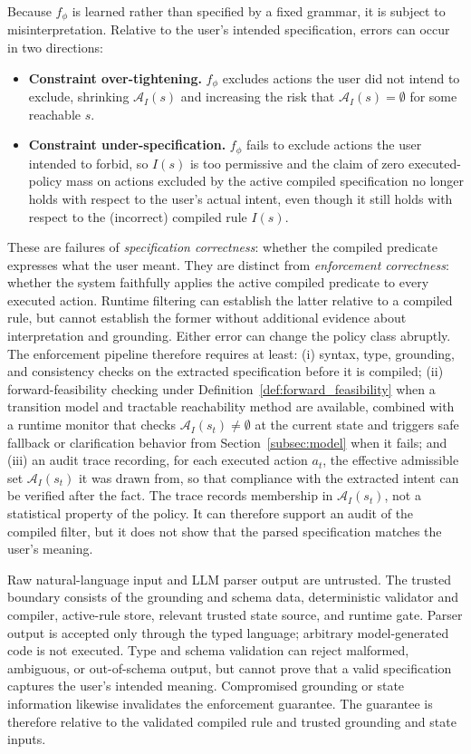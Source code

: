 \documentclass[journal]{IEEEtran}
\theoremstyle{definition}
\newcommand{\cA}{\mathcal{A}}
\begin{document}
Because $f_\phi$ is learned rather than specified by a fixed grammar, it is
subject to misinterpretation. Relative to the user's intended specification,
errors can occur in two directions:
\begin{itemize}[leftmargin=*]
  \item \textbf{Constraint over-tightening.} $f_\phi$ excludes actions the
  user did not intend to exclude, shrinking $\cA_I(s)$ and increasing the
  risk that $\cA_I(s) = \emptyset$ for some reachable $s$.
  \item \textbf{Constraint under-specification.} $f_\phi$ fails to exclude
  actions the user intended to forbid, so $I(s)$ is too permissive and the
  claim of zero executed-policy mass on actions excluded by the active compiled
  specification no longer holds with
  respect to the user's actual intent, even though it still holds with respect
  to the (incorrect) compiled rule $I(s)$.
\end{itemize}
These are failures of \emph{specification correctness}: whether the
compiled predicate expresses what the user meant. They are distinct from
\emph{enforcement correctness}: whether the system faithfully applies the
active compiled predicate to every executed action. Runtime filtering can
establish the latter relative to a compiled rule, but cannot establish the
former without additional evidence about interpretation and grounding.
Either error can change the policy class abruptly. The enforcement pipeline
therefore requires at least: (i) syntax, type,
grounding, and consistency checks on the extracted specification before it is
compiled; (ii) forward-feasibility checking under
Definition~\ref{def:forward_feasibility} when a transition model and tractable
reachability method are available,
combined with a runtime monitor that checks
$\cA_I(s_t) \neq \emptyset$ at the current state and triggers safe fallback
or clarification behavior from Section~\ref{subsec:model} when it fails; and
(iii) an audit trace recording,
for each executed action $a_t$, the effective admissible set $\cA_I(s_t)$ it was
drawn from, so that compliance with the extracted intent can be verified
after the fact. The trace records membership in $\cA_I(s_t)$, not a
statistical property of the policy. It can therefore support an audit of the
compiled filter, but it does not show that the parsed specification matches
the user's meaning.

Raw natural-language input and LLM parser output are untrusted. The trusted
boundary consists of the grounding and schema data, deterministic validator
and compiler, active-rule store, relevant trusted state source, and runtime
gate. Parser output is accepted only through the typed language; arbitrary
model-generated code is not executed. Type and schema validation can reject
malformed, ambiguous, or out-of-schema output, but cannot prove that a valid
specification captures the user's intended meaning. Compromised grounding or
state information likewise invalidates the enforcement guarantee. The
guarantee is therefore relative to the validated compiled rule and trusted
grounding and state inputs.
\end{document}
